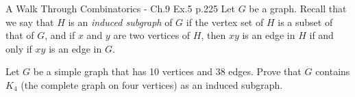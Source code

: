 \begin{problem}{}{}{A Walk Through Combinatorics - Ch.9 Ex.5 p.225}
Let $G$ be a graph. Recall that we say that $H$ is an \emph{induced subgraph}
of $G$ if the vertex set of $H$ is a subset of that of $G$, and if $x$ and $y$ are
two vertices of $H$, then $xy$ is an edge in $H$ if and only if $xy$ is an edge
in $G$.

Let $G$ be a simple graph that has 10 vertices and 38 edges. Prove that
$G$ contains $K_4$ (the complete graph on four vertices) as an induced
subgraph.
\end{problem}

\begin{solution}

\end{solution}